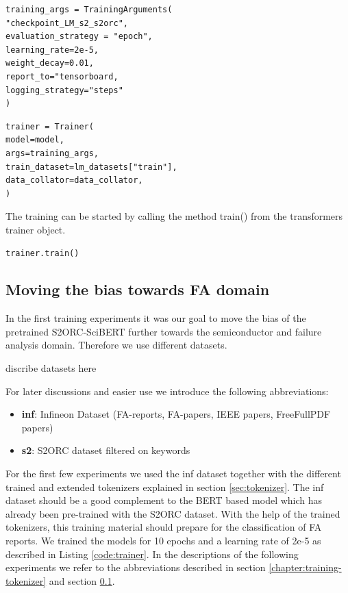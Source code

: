 \begin{code}
	\label{code:train_args}
\begin{verbatim}
training_args = TrainingArguments(
"checkpoint_LM_s2_s2orc",
evaluation_strategy = "epoch",
learning_rate=2e-5,
weight_decay=0.01,
report_to="tensorboard,
logging_strategy="steps"
)
\end{verbatim}
\end{code}

\begin{code}
	\label{code:trainer}
\begin{verbatim}
trainer = Trainer(
model=model,
args=training_args,
train_dataset=lm_datasets["train"],
data_collator=data_collator,
)
\end{verbatim}
\end{code}

The training can be started by calling the method train() from the \alert{transformers trainer object.}
\begin{code}
	\label{code:train}
\begin{verbatim}
trainer.train()
\end{verbatim}
\end{code}

\subsection{Moving the bias towards FA domain}\label{chapter:training-experiments}
In the first training experiments it was our goal to move the bias of the pretrained S2ORC-SciBERT further towards the semiconductor and failure analysis domain. Therefore we use different datasets. 

\alert{discribe datasets here}

For later discussions and easier use we introduce the following abbreviations:
\begin{itemize}
	\item \textbf{inf}: Infineon Dataset (FA-reports, FA-papers, IEEE papers, FreeFullPDF papers)
	\item \textbf{s2}: S2ORC dataset filtered on keywords
\end{itemize}

For the first few experiments we used the inf dataset together with the different trained and extended tokenizers explained in section \ref{sec:tokenizer}. The inf dataset should be a good complement to the BERT based model which has already been pre-trained with the S2ORC dataset. With the help of the trained tokenizers, this training material should prepare for the classification of FA reports. We trained the models for 10 epochs and a learning rate of 2e-5 as described in Listing \ref{code:trainer}. In the descriptions of the following experiments we refer to the abbreviations described in section \ref{chapter:training-tokenizer} and section \ref{chapter:training-experiments}. \newline

